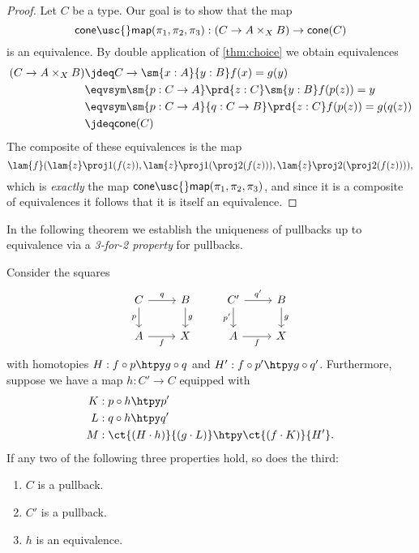 \begin{proof}
Let $C$ be a type. Our goal is to show that the map
\begin{equation*}
\mathsf{cone\usc{}map}(\pi_1,\pi_2,\pi_3): (C\to A\times_X B)\to \mathsf{cone}(C)
\end{equation*}
is an equivalence. 
By double application of \cref{thm:choice} we obtain equivalences
\begin{align*}
(C\to A\times_X B) & \jdeq C\to \sm{x:A}{y:B}f(x)=g(y) \\
& \eqvsym \sm{p:C\to A}\prd{z:C}\sm{y:B} f(p(z))= y \\
& \eqvsym \sm{p:C\to A}{q:C\to B}\prd{z:C} f(p(z))= g(q(z)) \\
& \jdeq \mathsf{cone}(C)
\end{align*}
The composite of these equivalences is the map
\begin{equation*}
\lam{f}(\lam{z}\proj 1(f(z)),\lam{z} \proj 1(\proj 2(f(z))),\lam{z}\proj 2(\proj 2(f(z)))),
\end{equation*}
which is \emph{exactly} the map $\mathsf{cone\usc{}map}(\pi_1,\pi_2,\pi_3)$, and since it is a composite of equivalences it follows that it is itself an equivalence.
\end{proof}

In the following theorem we establish the uniqueness of pullbacks up to equivalence via a \emph{3-for-2 property} for pullbacks.

\begin{thm}\label{thm:pb_3for2}
Consider the squares
\begin{equation*}
\begin{tikzcd}
C \arrow[r,"q"] \arrow[d,swap,"p"] & B \arrow[d,"g"] & {C'} \arrow[r,"{q'}"] \arrow[d,swap,"{p'}"] & B \arrow[d,"g"] \\
A \arrow[r,swap,"f"] & X & A \arrow[r,swap,"f"] & X
\end{tikzcd}
\end{equation*}
with homotopies $H:f\circ p \htpy g\circ q$ and $H':f\circ p'\htpy g\circ q'$.
Furthermore, suppose we have a map $h:C'\to C$ equipped with
\begin{align*}
K & : p\circ h \htpy p' \\
L & : q\circ h \htpy q' \\
M & : \ct{(H\cdot h)}{(g\cdot L)} \htpy \ct{(f\cdot K)}{H'}.
\end{align*}
If any two of the following three properties hold, so does the third:
\begin{samepage}%
\begin{enumerate}
\item $C$ is a pullback.
\item $C'$ is a pullback.
\item $h$ is an equivalence.
\end{enumerate}%
\end{samepage}%
\end{thm}

